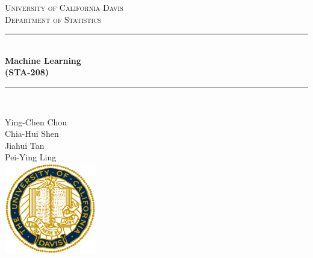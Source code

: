 \documentclass[12pt]{article}
\begin{document}
\begin{titlepage}

\newcommand{\HRule}{\rule{\linewidth}{0.5mm}} %

\center %
 

\textsc{\LARGE University of California Davis }\\[0.3cm] 
\textsc{\Large Department of Statistics}\\[0.5cm] 


\HRule \\[0.4cm]
{ \huge \bfseries Machine Learning\\  (STA-208)}\\[0.03cm]
\HRule \\[1.5cm]

\hfill \break \hfill \break \hfill \break
\hfill \break \hfill \break \hfill \break 
\hfill \break \hfill \break \hfill \break
\hfill \break

{\large Ying-Chen Chou \\ Chia-Hui Shen \\Jiahui Tan\\ Pei-Ying Ling}\\

\includegraphics[width=4cm]{logo.png}\\[1cm] 
 

\vfill %

\end{titlepage}

\newpage
\tableofcontents
\newpage
\end{document}
